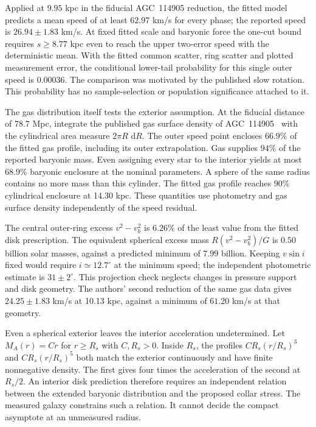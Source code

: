 \documentclass[11pt]{article}
\newcommand{\dd}{\,\mathrm d}
\begin{document}
Applied at $9.95$ kpc in the fiducial AGC~114905 reduction, the fitted
model predicts a mean speed of at least $62.97$ km/s for every phase;
the reported speed is $26.94\pm1.83$ km/s. At fixed fitted scale and
baryonic force the one-cut bound requires $s\geq8.77$ kpc even to reach
the upper two-error speed with the deterministic mean. With the fitted common scatter, ring scatter
and plotted measurement error, the conditional lower-tail probability
for this single outer speed is $0.00036$. The comparison was motivated
by the published slow rotation. This probability has no sample-selection
or population significance attached to it.

The gas distribution itself tests the exterior assumption. At the
fiducial distance of 78.7 Mpc, integrate the published gas surface
density of AGC~114905~\cite{mancera2024} with the cylindrical area
measure $2\pi R\,\dd R$. The outer speed point encloses $66.9\%$ of
the fitted gas profile, including its outer extrapolation. Gas supplies
$94\%$ of the reported baryonic mass. Even assigning every star to
the interior yields at most $68.9\%$ baryonic enclosure at the nominal
parameters. A sphere of the same radius contains no more mass than
this cylinder. The fitted gas profile reaches $90\%$ cylindrical
enclosure at 14.30 kpc. These quantities use photometry and gas
surface density independently of the speed residual.

The central outer-ring excess $v^2-v_b^2$ is $6.26\%$ of the least
value from the fitted disk prescription. The equivalent spherical
excess mass $R(v^2-v_b^2)/G$ is $0.50$ billion solar masses, against
a predicted minimum of $7.99$ billion. Keeping $v\sin i$ fixed would
require $i\simeq12.7^\circ$ at the minimum speed; the independent
photometric estimate is $31\pm2^\circ$. This projection check neglects
changes in pressure support and disk geometry. The authors' second
reduction of the same gas data gives $24.25\pm1.83$ km/s at 10.13 kpc,
against a minimum of $61.20$ km/s at that geometry.

Even a spherical exterior leaves the interior acceleration undetermined.
Let $M_A(r)=Cr$ for $r\ge R_s$ with $C,R_s>0$. Inside $R_s$, the
profiles $C R_s(r/R_s)^3$ and $C R_s(r/R_s)^5$ both match the
exterior continuously and have finite nonnegative density. The first
gives four times the acceleration of the second at $R_s/2$. An
interior disk prediction therefore requires an independent relation
between the extended baryonic distribution and the proposed collar
stress. The measured galaxy constrains such a relation. It cannot
decide the compact asymptote at an unmeasured radius.
\end{document}
